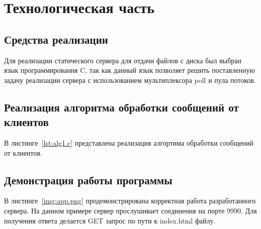 \chapter{Технологическая часть}
\section{Средства реализации}
Для реализации статического сервера для отдачи файлов с диска был выбран 
язык программирования C, так как данный язык позволяет решить поставленную задачу
реализации сервера с использованием мультиплексора poll и пула потоков. 

\section{Реализация алгоритма обработки сообщений от клиентов}
В листинге~\ref{lst:alg1.c} представлена реализация алгортима обработки сообщений от клиентов. 

\section{Демонстрация работы программы}
В листинге~\ref{img:app.png} продемонстрирована корректная работа 
разработанного сервера. На данном примере сервер прослушивает соединения 
на порте 9990. Для получения ответа делается GET запрос по пути к index.html файлу.

